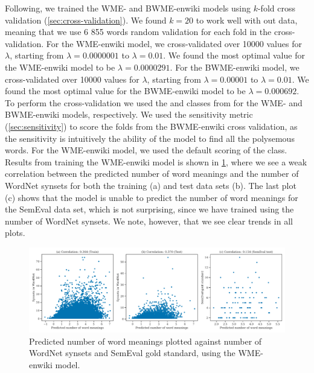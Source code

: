 Following, we trained the WME- and BWME-enwiki models using $k$-fold cross validation (\cref{sec:cross-validation}). We found $k=20$ to work well with out data, meaning that we use 6 855 words random validation for each fold in the cross-validation. For the WME-enwiki model, we cross-validated over 10000 values for $\lambda$, starting from $\lambda=0.0000001$ to $\lambda=0.01$. We found the most optimal value for the WME-enwiki model to be $\lambda=0.0000291$. For the BWME-enwiki model, we cross-validated over 10000 values for $\lambda$, starting from $\lambda=0.00001$ to $\lambda=0.01$. We found the most optimal value for the BWME-enwiki model to be $\lambda=0.000692$. To perform the cross-validation we used the  and  classes from  for the WME- and BWME-enwiki models, respectively. We used the sensitivity metric (\cref{sec:sensitivity}) to score the folds from the BWME-enwiki cross validation, as the sensitivity is intuitively the ability of the model to find all the polysemous words. For the WME-enwiki model, we used the default scoring of the  class. Results from training the WME-enwiki model is shown in \cref{fig:wme-enwiki-correlation-result}, where we see a weak correlation between the predicted number of word meanings and the number of WordNet synsets for both the training (a) and test data sets (b). The last plot (c) shows that the model is unable to predict the number of word meanings for the SemEval data set, which is not surprising, since we have trained using the number of WordNet synsets. We note, however, that we see clear trends in all plots.
\begin{figure}[H]
    \centering
    \includegraphics[width=\textwidth]{thesis/figures/wme-enwiki-correlation-result.pdf}
    \caption{Predicted number of word meanings plotted against number of WordNet synsets and SemEval gold standard, using the WME-enwiki model.}
    \label{fig:wme-enwiki-correlation-result}
\end{figure}

